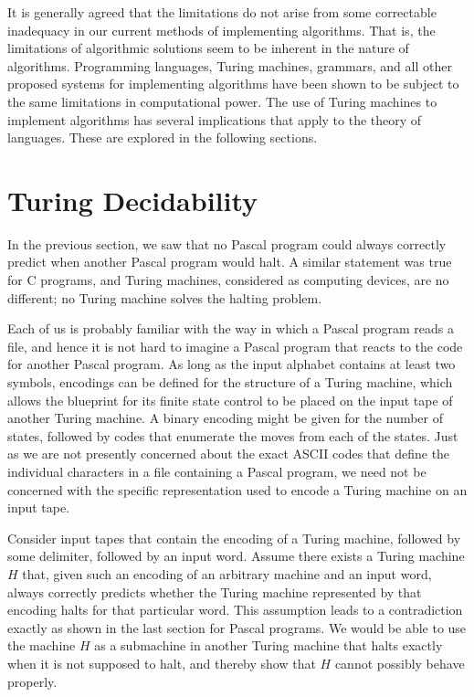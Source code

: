 It is generally agreed that the limitations do not arise from some correctable
inadequacy in our current methods of implementing algorithms. That is, the
limitations of algorithmic solutions seem to be inherent in the nature of
algorithms. Programming languages, Turing machines, grammars, and all other
proposed systems for implementing algorithms have been shown to be subject to
the same limitations in computational power. The use of Turing machines to
implement algorithms has several implications that apply to the theory of
languages. These are explored in the following sections.

\section{Turing Decidability}\label{sec-12.4}

In the previous section, we saw that no Pascal program could always correctly
predict when another Pascal program would halt. A similar statement was true
for C programs, and Turing machines, considered as computing devices, are no
different; no Turing machine solves the halting problem.

Each of us is probably familiar with the way in which a Pascal program reads a
file, and hence it is not hard to imagine a Pascal program that reacts to the
code for another Pascal program. As long as the input alphabet contains at least
two symbols, encodings can be defined for the structure of a Turing machine,
which allows the blueprint for its finite state control to be placed on the
input tape of another Turing machine. A binary encoding might be given for the
number of states, followed by codes that enumerate the moves from each of the
states. Just as we are not presently concerned about the exact ASCII codes that
define the individual characters in a file containing a Pascal program, we need
not be concerned with the specific representation used to encode a Turing
machine on an input tape.

Consider input tapes that contain the encoding of a Turing machine, followed
by some delimiter, followed by an input word. Assume there exists a Turing
machine $H$ that, given such an encoding of an arbitrary machine and an input word,
always correctly predicts whether the Turing machine represented by that
encoding halts for that particular word. This assumption leads to a
contradiction exactly as shown in the last section for Pascal programs. We would
be able to use the machine $H$ as a submachine in another Turing machine that
halts exactly when it is not supposed to halt, and thereby show that $H$ cannot
possibly behave properly.

